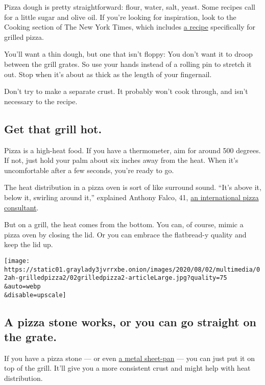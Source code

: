 Pizza dough is pretty straightforward: flour, water, salt, yeast. Some
recipes call for a little sugar and olive oil. If you're looking for
inspiration, look to the Cooking section of The New York Times, which
includes
\href{https://cooking.nytimes3xbfgragh.onion/recipes/1014838-pizza-on-the-grill}{a
recipe} specifically for grilled pizza.

You'll want a thin dough, but one that isn't floppy: You don't want it
to droop between the grill grates. So use your hands instead of a
rolling pin to stretch it out. Stop when it's about as thick as the
length of your fingernail.

Don't try to make a separate crust. It probably won't cook through, and
isn't necessary to the recipe.

\hypertarget{get-that-grill-hot}{%
\subsection{Get that grill hot.}\label{get-that-grill-hot}}

Pizza is a high-heat food. If you have a thermometer, aim for around 500
degrees. If not, just hold your palm about six inches away from the
heat. When it's uncomfortable after a few seconds, you're ready to go.

The heat distribution in a pizza oven is sort of like surround sound.
``It's above it, below it, swirling around it,'' explained Anthony
Falco, 41, \href{https://www.piz.za.com/}{an international pizza
consultant}.

But on a grill, the heat comes from the bottom. You can, of course,
mimic a pizza oven by closing the lid. Or you can embrace the
flatbread-y quality and keep the lid up.

\texttt{[image: https://static01.graylady3jvrrxbe.onion/images/2020/08/02/multimedia/02ah-grilledpizza2/02grilledpizza2-articleLarge.jpg?quality=75\\\&auto=webp\\\&disable=upscale]}

\hypertarget{a-pizza-stone-works-or-you-can-go-straight-on-the-grate}{%
\subsection{A pizza stone works, or you can go straight on the
grate.}\label{a-pizza-stone-works-or-you-can-go-straight-on-the-grate}}

If you have a pizza stone --- or even
\href{https://cooking.nytimes3xbfgragh.onion/recipes/1020233-sheet-pan-pizza-with-asparagus-and-arugula}{a
metal sheet-pan} --- you can just put it on top of the grill. It'll give
you a more consistent crust and might help with heat distribution.

